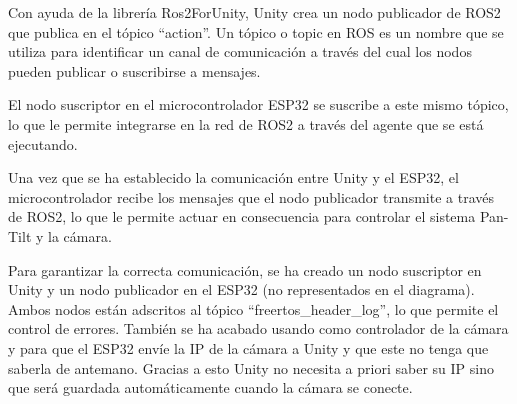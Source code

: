 Con ayuda de la librería Ros2ForUnity, Unity crea un nodo publicador de ROS2 que publica en el tópico ``action''. Un tópico o topic en ROS es un nombre que se utiliza para identificar un canal de comunicación a través del cual los nodos pueden publicar o suscribirse a mensajes.

El nodo suscriptor en el microcontrolador ESP32 se suscribe a este mismo tópico, lo que le permite integrarse en la red de ROS2 a través del agente que se está ejecutando.



Una vez que se ha establecido la comunicación entre Unity y el ESP32, el microcontrolador recibe los mensajes que el nodo publicador transmite a través de ROS2, lo que le permite actuar en consecuencia para controlar el sistema Pan-Tilt y la cámara.



Para garantizar la correcta comunicación, se ha creado un nodo suscriptor en Unity y un nodo publicador en el ESP32 (no representados en el diagrama). Ambos nodos están adscritos al tópico ``freertos\_header\_log'', lo que permite el control de errores. También se ha acabado usando como controlador de la cámara y para que el ESP32 envíe la IP de la cámara a Unity y que este no tenga que saberla de antemano. Gracias a esto Unity no necesita a priori saber su IP sino que será guardada automáticamente cuando la cámara se conecte.
